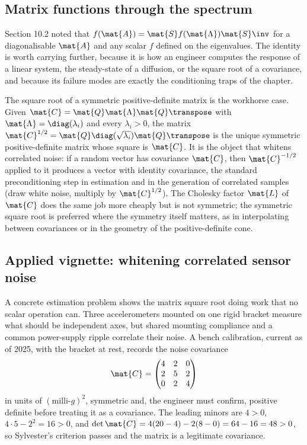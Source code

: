 \subsection{Matrix functions through the spectrum}

Section 10.2 noted that $f(\mat{A}) = \mat{S}f(\mat{\Lambda})\mat{S}\inv$
for a diagonalisable $\mat{A}$ and any scalar $f$ defined on the
eigenvalues. The identity is worth carrying further, because it is how
an engineer computes the response of a linear system, the steady-state
of a diffusion, or the square root of a covariance, and because its
failure modes are exactly the conditioning traps of the chapter.

The square root of a symmetric positive-definite matrix is the workhorse
case. Given $\mat{C} = \mat{Q}\mat{\Lambda}\mat{Q}\transpose$ with
$\mat{\Lambda} = \diag(\lambda_{i})$ and every $\lambda_{i} > 0$, the
matrix $\mat{C}^{1/2} = \mat{Q}\diag(\sqrt{\lambda_{i}})\mat{Q}
\transpose$ is the unique symmetric positive-definite matrix whose
square is $\mat{C}$. It is the object that whitens correlated noise: if
a random vector has covariance $\mat{C}$, then $\mat{C}^{-1/2}$ applied
to it produces a vector with identity covariance, the standard
preconditioning step in estimation and in the generation of correlated
samples (draw white noise, multiply by $\mat{C}^{1/2}$). The Cholesky
factor $\mat{L}$ of $\mat{C}$ does the same job more cheaply but is not
symmetric; the symmetric square root is preferred where the symmetry
itself matters, as in interpolating between covariances or in the
geometry of the positive-definite cone.

\subsection{Applied vignette: whitening correlated sensor noise}

A concrete estimation problem shows the matrix square root doing work
that no scalar operation can. Three accelerometers mounted on one rigid
bracket measure what should be independent axes, but shared mounting
compliance and a common power-supply ripple correlate their noise. A
bench calibration, current as of 2025, with the bracket at rest,
records the noise covariance
\[
\mat{C} = \begin{pmatrix} 4 & 2 & 0 \\ 2 & 5 & 2 \\ 0 & 2 & 4
\end{pmatrix}
\]
in units of $(\text{milli-}g)^{2}$, symmetric and, the engineer must
confirm, positive definite before treating it as a covariance. The
leading minors are $4 > 0$, $4\cdot5 - 2^{2} = 16 > 0$, and $\det
\mat{C} = 4(20-4) - 2(8-0) = 64 - 16 = 48 > 0$, so Sylvester's
criterion passes and the matrix is a legitimate covariance.

